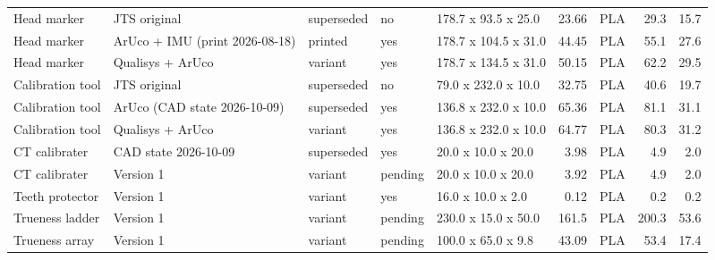 \begin{tabular}{lllllrlrr}
Head marker & JTS original & superseded & no & 178.7 x 93.5 x 25.0 & 23.66 & PLA & 29.3 & 15.7 \\
Head marker & ArUco + IMU (print 2026-08-18) & printed & yes & 178.7 x 104.5 x 31.0 & 44.45 & PLA & 55.1 & 27.6 \\
Head marker & Qualisys + ArUco & variant & yes & 178.7 x 134.5 x 31.0 & 50.15 & PLA & 62.2 & 29.5 \\
Calibration tool & JTS original & superseded & no & 79.0 x 232.0 x 10.0 & 32.75 & PLA & 40.6 & 19.7 \\
Calibration tool & ArUco (CAD state 2026-10-09) & superseded & yes & 136.8 x 232.0 x 10.0 & 65.36 & PLA & 81.1 & 31.1 \\
Calibration tool & Qualisys + ArUco & variant & yes & 136.8 x 232.0 x 10.0 & 64.77 & PLA & 80.3 & 31.2 \\
CT calibrater & CAD state 2026-10-09 & superseded & yes & 20.0 x 10.0 x 20.0 & 3.98 & PLA & 4.9 & 2.0 \\
CT calibrater & Version 1 & variant & pending & 20.0 x 10.0 x 20.0 & 3.92 & PLA & 4.9 & 2.0 \\
Teeth protector & Version 1 & variant & yes & 16.0 x 10.0 x 2.0 & 0.12 & PLA & 0.2 & 0.2 \\
Trueness ladder & Version 1 & variant & pending & 230.0 x 15.0 x 50.0 & 161.5 & PLA & 200.3 & 53.6 \\
Trueness array & Version 1 & variant & pending & 100.0 x 65.0 x 9.8 & 43.09 & PLA & 53.4 & 17.4 \\
\bottomrule
\end{tabular}
